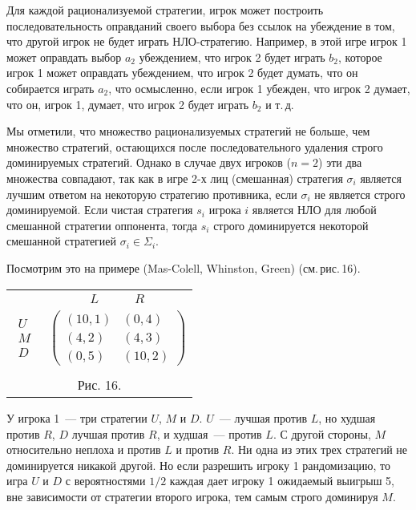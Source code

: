 \documentclass[12pt]{article}
\begin{document}
Для каждой рационализуемой стратегии, игрок может построить
последовательность оправданий своего выбора без ссылок на убеждение
в том, что другой игрок не будет играть НЛО-стратегию. Например, в
этой игре игрок 1 может оправдать выбор $a_2$ убеждением, что  игрок
2 будет играть $b_2$, которое игрок 1 может оправдать убеждением,
что игрок 2 будет думать, что он собирается играть $a_2$, что
осмысленно, если игрок 1 убежден, что игрок 2 думает, что он, игрок
1, думает, что игрок 2 будет играть $b_2$  и т.\,д.

Мы отметили, что множество рационализуемых стратегий не больше, чем
множество стратегий, остающихся после последовательного удаления
строго доминируемых стратегий. Однако в случае двух игроков ($n=2$)
эти два множества совпадают, так как  в игре 2-х лиц (смешанная)
стратегия $\sigma_i$ является лучшим ответом на некоторую стратегию
противника, если $\sigma_i$ не является  строго доминируемой. Если
чистая стратегия $s_i$  игрока $i$  является НЛО для любой смешанной
стратегии оппонента, тогда $s_i$ строго доминируется некоторой
смешанной стратегией $\sigma_i\in\Sigma_i$.

Посмотрим это на примере (Mas-Colell, Whinston, Green)
(см.\,рис.\,16).

\begin{center}
\begin{tabular}{cc}
&$\begin{array}{cc} L\quad &\quad R \end{array}$\\
$\begin{array}{c} U\\ M\\ D\end{array}$& $\left(\begin{array}{cc}
(10,1)&(0,4)\\
(4,2)&(4,3)\\
(0,5)&(10,2) \end{array}\right)$\\
\multicolumn{2}{c}{}\\
\multicolumn{2}{c}{Рис. 16.}\\
\end{tabular}
\end{center}

У игрока 1~--- три стратегии $U$, $M$ и $D$. $U$~--- лучшая против
$L$, но худшая против $R$, $D$ лучшая против $R$, и худшая~---
против $L$. С другой стороны, $M$ относительно неплоха и против $L$
и против $R$. Ни одна из этих трех стратегий не доминируется никакой
другой. Но если разрешить игроку 1 рандомизацию, то игра $U$ и $D$ с
вероятностями $1/2$ каждая дает игроку 1 ожидаемый выигрыш 5, вне
зависимости от стратегии второго игрока, тем самым строго доминируя
$M$.
\end{document}
